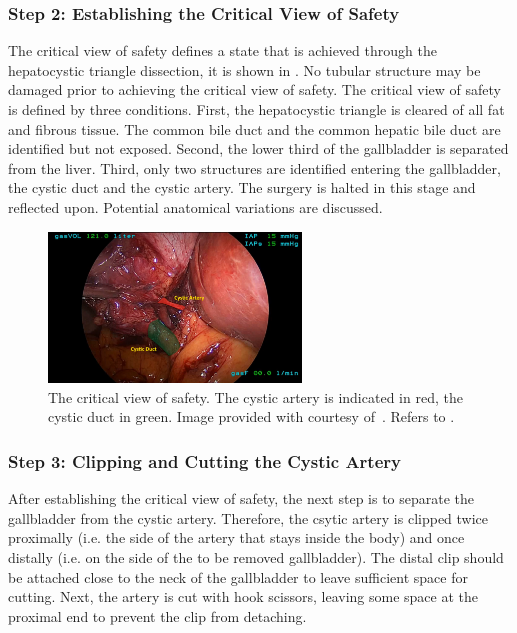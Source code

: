 \subsubsection{Step 2: Establishing the Critical View of Safety} 
\label{in:sec:critical_view_of_safety}
The critical view of safety defines a state that is achieved through the hepatocystic triangle dissection, it is shown in . No tubular structure may be damaged prior to achieving the critical view of safety. The critical view of safety is defined by three conditions. First, the hepatocystic triangle is cleared of all fat and fibrous tissue. The common bile duct and the common hepatic bile duct are identified but not exposed. Second, the lower third of the gallbladder is separated from the liver. Third, only two structures are identified entering the gallbladder, the cystic duct and the cystic artery. The surgery is halted in this stage and reflected upon. Potential anatomical variations are discussed.

\begin{figure}[tb]
    \centering
    \includegraphics[width=0.6\textwidth]{introduction/img/critical_view_of_safety.png}
    \caption{The critical view of safety. The cystic artery is indicated in red, the cystic duct in green. Image provided with courtesy of~\cite{ALES5766}. Refers to .}
    \label{in:fig:critical_view_of_safety}
\end{figure}

\subsubsection{Step 3: Clipping and Cutting the Cystic Artery} After establishing the critical view of safety, the next step is to separate the gallbladder from the cystic artery. Therefore, the csytic artery is clipped twice proximally (i.e. the side of the artery that stays inside the body) and once distally (i.e. on the side of the to be removed gallbladder). The distal clip should be attached close to the neck of the gallbladder to leave sufficient space for cutting. Next, the artery is cut with hook scissors, leaving some space at the proximal end to prevent the clip from detaching.

